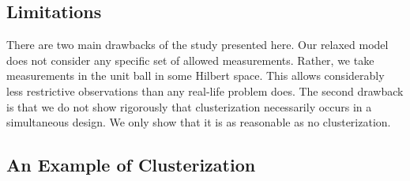 \documentclass{amsart}
\numberwithin{equation}{section}
\begin{document}
\subsection{Limitations}\label{subsec:limitations}
There are two main drawbacks of the study presented here. Our relaxed
model does not consider any specific set of allowed
measurements. Rather, we take measurements in the unit ball in some
Hilbert space. This allows considerably less restrictive observations
than any real-life problem does. The second drawback is that we do not
show rigorously that clusterization necessarily occurs in a
simultaneous design. We only show that it is as reasonable as no
clusterization.


\subsection{An Example of Clusterization}\label{subsec:example}
\end{document}
